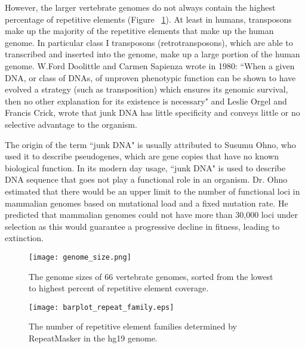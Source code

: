 However, the larger vertebrate genomes do not always contain the highest percentage of repetitive elements (Figure ~\ref{fig:genome_size}). At least in humans, transposons make up the majority of the repetitive elements that make up the human genome. In particular class I transposons (retrotransposons), which are able to transcribed and inserted into the genome, make up a large portion of the human genome. W.Ford Doolittle and Carmen Sapienza wrote in 1980\cite{doolittle1980selfish}: ``When a given DNA, or class of DNAs, of unproven phenotypic function can be shown to have evolved a strategy (such as transposition) which ensures its genomic survival, then no other explanation for its existence is necessary" and Leslie Orgel and Francis Crick, wrote that junk DNA has little specificity and conveys little or no selective advantage to the organism\cite{orgel1980selfish}.

The origin of the term ``junk DNA" is usually attributed to Susumu Ohno, who used it to describe pseudogenes, which are gene copies that have no known biological function. In its modern day usage, ``junk DNA" is used to describe DNA sequence that goes not play a functional role in an organism. Dr. Ohno estimated that there would be an upper limit to the number of functional loci in mammalian genomes based on mutational load and a fixed mutation rate. He predicted that mammalian genomes could not have more than 30,000 loci under selection as this would guarantee a progressive decline in fitness, leading to extinction.

\begin{figure}[h]
   \centering
   \texttt{[image: genome\_size.png]}
   \caption[Vertebrate genomes sizes]{The genome sizes of 66 vertebrate genomes, sorted from the lowest to highest percent of repetitive element coverage\cite{tang2014gensize}.}
   \label{fig:genome_size}
\end{figure}

\begin{figure}[h]
   \centering
   \texttt{[image: barplot\_repeat\_family.eps]}
   \caption[Tally of repetitive element families in the hg19 genome]{The number of repetitive element families determined by RepeatMasker in the hg19 genome.}
   \label{fig:repeat_family}
\end{figure}

